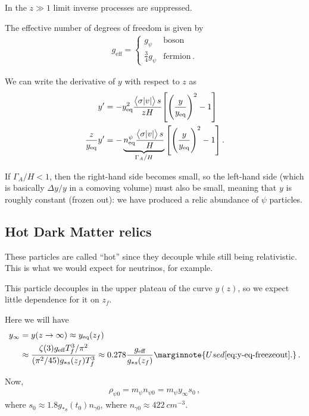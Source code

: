 \documentclass[main.tex]{subfiles}
\begin{document}
In the \(z \gg 1\) limit inverse processes are suppressed.

The effective number of degrees of freedom is given by 
%
\begin{align}
g _{\text{eff}} = \begin{cases}
    g_\psi & \text{boson} \\
    \frac{3}{4} g_\psi & \text{fermion} 
\,.
\end{cases}
\end{align}

We can write the derivative of \(y\) with respect to \(z\) as 
%
\begin{align}
y' &= - y^2 _{\text{eq}} \frac{\expval{\sigma \abs{v}} s}{zH} \qty[ \qty(\frac{y}{y _{\text{eq}}})^2 - 1] \\
\frac{z}{y _{\text{eq}}} y' &= - \underbrace{n^\psi  _{\text{eq}} \frac{\expval{\sigma \abs{v}} s}{H}}_{\Gamma_A / H} \qty[ \qty(\frac{y}{y _{\text{eq}}})^2 - 1] 
\,.
\end{align}

If \(\Gamma _A / H <1\), then the right-hand side becomes small, so the left-hand side (which is basically \(\Delta y / y\) in a comoving volume) must also be small, meaning that \(y\) is roughly constant (frozen out): we have produced a relic abundance of \(\psi \) particles.

\subsection{Hot Dark Matter relics}

These particles are called ``hot'' since they decouple while still being relativistic. This is what we would expect for neutrinos, for example. 

This particle decouples in the upper plateau of the curve \(y(z)\), so we expect little dependence for it on \(z_f\). 

Here we will have 
%
\begin{align}
y_\infty &= y(z \to \infty ) \approx y _{\text{eq}} (z_f)  \\
&\approx \frac{\zeta (3) g _{\text{eff}}T_f^3 / \pi^2}{(\pi^2 / 45) g_{*s } (z_f) T_f^3} \approx \num{.278} \frac{g _{\text{eff}}}{g_{*s} (z_f)}
\marginnote{Used \eqref{eq:y-eq-freezeout}.}
\,.
\end{align}

Now, 
%
\begin{align}
\rho_{\psi 0 } = m_\psi n_{\psi 0 } = m_\psi y_\infty s_0 
\,,
\end{align}
%
where \(s_0 \approx 1.8 g_{*s} (t_0 ) n_{\gamma 0 }\), where \(n_{\gamma 0} \approx \SI{422}{cm^{-3}}\). 
\end{document}
